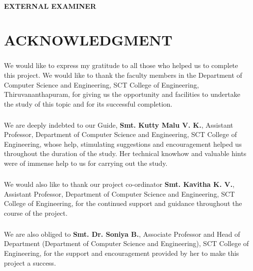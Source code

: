 \documentclass[a4paper,12pt]{report}
\begin{document}
  \begin{center}
	  \textbf{EXTERNAL EXAMINER}
  \end{center}


\chapter*{\large{ACKNOWLEDGMENT}}
\paragraph{}We would like to express my gratitude to all those who helped us to complete this project. We would like to thank the faculty members in the Department of Computer Science and Engineering, SCT College of Engineering, Thiruvananthapuram, for giving us the opportunity and facilities to undertake the study of this topic and for its successful completion.
\paragraph{} We are deeply indebted to our Guide, \textbf{Smt. Kutty Malu V. K.}, Assistant Professor, Department of Computer Science and Engineering, SCT College of Engineering, whose help, stimulating suggestions and encouragement helped us throughout the duration of the study. Her technical knowhow and valuable hints were of immense help to us for carrying out the study.
\paragraph{} We would also like to thank our project co-ordinator \textbf{Smt. Kavitha K. V.}, Assistant Professor, Department of Computer Science and Engineering, SCT College of Engineering, for the continued support and guidance throughout the course of the project.
\paragraph{} We are also obliged to \textbf{Smt. Dr. Soniya B.}, Associate Professor and Head of Department (Department of Computer Science and Engineering), SCT College of Engineering, for the support and encouragement provided by her to make this project a success.
\thispagestyle{empty}
\end{document}
